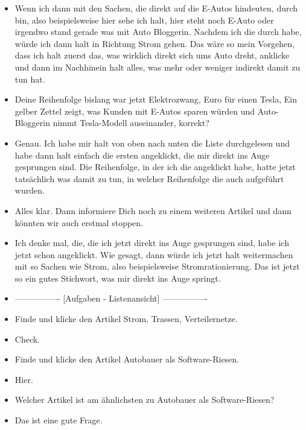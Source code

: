 {\begin{itemize}[]
        \item {} Wenn ich dann mit den Sachen, die direkt auf die E-Autos hindeuten, durch bin, also beispielsweise hier sehe ich halt, hier steht noch E-Auto oder irgendwo stand gerade was mit Auto Bloggerin.
              Nachdem ich die durch habe, würde ich dann halt in Richtung Strom gehen.
              Das wäre so mein Vorgehen, dass ich halt zuerst das, was wirklich direkt sich ums Auto dreht, anklicke und dann im Nachhinein halt alles, was mehr oder weniger indirekt damit zu tun hat.
        \item {} Deine Reihenfolge bislang war jetzt \flqq Elektrozwang\frqq{},  Euro für einen Tesla\frqq{}, \flqq Ein gelber Zettel zeigt, was Kunden mit E-Autos sparen würden\frqq{} und \flqq Auto-Bloggerin nimmt Tesla-Modell auseinander\frqq{}, korrekt?
        \item {} Genau.
              Ich habe mir halt von oben nach unten die Liste durchgelesen und habe dann halt einfach die ersten angeklickt, die mir direkt ins Auge gesprungen sind.
              Die Reihenfolge, in der ich die angeklickt habe, hatte jetzt tatsächlich was damit zu tun, in welcher Reihenfolge die auch aufgeführt wurden.
        \item {} Alles klar. Dann informiere Dich noch zu einem weiteren Artikel und dann könnten wir auch erstmal stoppen.
        \item {} Ich denke mal, die, die ich jetzt direkt ins Auge gesprungen sind, habe ich jetzt schon angeklickt.
              Wie gesagt, dann würde ich jetzt halt weitermachen mit so Sachen wie Strom, also beispielsweise \flqq Stromrationierung\frqq{}.
              Das ist jetzt so ein gutes Stichwort, was mir direkt ins Auge springt.
        \item {----------------} [Aufgaben - Listenansicht] {----------------}
        \item {} Finde und klicke den Artikel \flqq Strom, Trassen, Verteilernetze\frqq{}.
        \item {} Check.
        \item {} Finde und klicke den Artikel \flqq Autobauer als Software-Riesen\frqq{}.
        \item {} Hier.
        \item {} Welcher Artikel ist am ähnlichsten zu \flqq Autobauer als Software-Riesen\frqq{}?
        \item {} Das ist eine gute Frage.

\end{itemize}}
